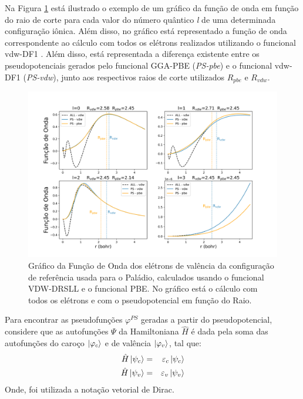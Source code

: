 Na Figura \ref{fig:pseudo} está ilustrado o exemplo de um gráfico da função de onda em função do raio de corte para cada  valor do número quântico \textit{l} de uma determinada configuração iônica. Além disso, no gráfico está representado a função de onda correspondente ao cálculo com todos os elétrons realizados utilizando o funcional vdw-DF1 \cite{DRSLL}. Além disso, está representada a diferença existente entre os pseudopotenciais gerados pelo funcional GGA-PBE (\textit{PS-pbe}) e o funcional vdw-DF1 (\textit{PS-vdw}), junto aos respectivos raios de corte utilizados $ R_{pbe} $ e $ R_{vdw} $.
\begin{figure}[]
	\centering
	\caption{Gráfico da Função de Onda dos elétrons de valência da configuração de referência usada para o Paládio, calculados usando o funcional VDW-DRSLL e o funcional PBE. No gráfico está o cálculo com todos os elétrons e com o pseudopotencial em função do Raio.}	\label{fig:pseudo}
	\includegraphics[scale=0.45]{figs/pseudo.png}
\end{figure} 

Para encontrar as pseudofunções $ \varphi^{PS} $ geradas a partir do pseudopotencial, considere que as autofunções $ \Psi $ da Hamiltoniana $ \hat{H} $ é dada pela soma das autofunções do caroço $ \ket{\varphi_{c}} $ e de valência $ \ket{\varphi_{v}} $, tal que:
\begin{eqnarray}
	\hat{H}\ket{\psi_{c}}&=&\varepsilon_{c}\ket{\psi_{c}}\label{eq:caroco}\\
	\hat{H}\ket{\psi_{v}}&=&\varepsilon_{v}\ket{\psi_{v}}\label{eq:valencia}
\end{eqnarray}
Onde, foi utilizada a notação vetorial de Dirac. 

